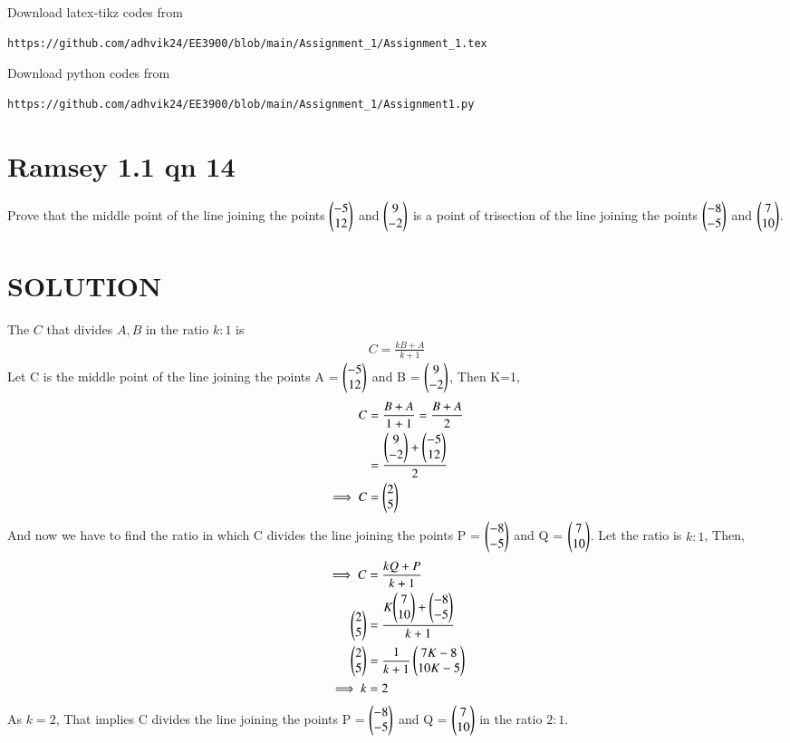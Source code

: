\documentclass[journal,12pt,twocolumn]{IEEEtran}
\begin{document}
%
Download latex-tikz codes from 
%
\begin{lstlisting}
https://github.com/adhvik24/EE3900/blob/main/Assignment_1/Assignment_1.tex
\end{lstlisting}
%
Download python codes from 
%
\begin{lstlisting}
https://github.com/adhvik24/EE3900/blob/main/Assignment_1/Assignment1.py
\end{lstlisting}
\section{Ramsey 1.1 qn 14}
Prove that the middle point of the line joining the points $\begin{pmatrix}-5\\12\end{pmatrix}$ and $\begin{pmatrix}9\\-2\end{pmatrix}$ is a point of trisection of the line
joining the points $\begin{pmatrix}-8\\-5\end{pmatrix}$ and $\begin{pmatrix}7\\10\end{pmatrix}$.
\section{SOLUTION}
The ${C}$ that divides ${A},{B}$ in the ratio $k:1$ is
\begin{align}
{C}=\frac{k{B}+{A}}{k+1}\label{0}
\end{align}
Let C is the middle point of the line joining the points A = $\begin{pmatrix}-5\\12\end{pmatrix}$ and B = $\begin{pmatrix}9\\-2\end{pmatrix}$, Then K=1,
\begin{align}
    {C}&=\frac{{B}+{A}}{1+1}=\frac{{B}+{A}}{2}\\
    &= \frac{\begin{pmatrix}9\\-2\end{pmatrix}+\begin{pmatrix}-5\\12\end{pmatrix}}{2}\\
    \implies {C}&= \begin{pmatrix}2\\5\end{pmatrix}
\end{align}
And now we have to find the ratio in which C divides the line
joining the points P = $\begin{pmatrix}-8\\-5\end{pmatrix}$ and Q = $\begin{pmatrix}7\\10\end{pmatrix}$. Let the ratio is $k:1$,
Then,
\begin{align}
    \implies {C}&=\frac{k{Q}+{P}}{k+1}\\
    \begin{pmatrix}2\\5\end{pmatrix} &= \frac{{K{\begin{pmatrix}7\\10\end{pmatrix}+\begin{pmatrix}-8\\-5\end{pmatrix}}}}{k+1}\\
    \begin{pmatrix}2\\5\end{pmatrix}&=\frac{1}{k+1} \begin{pmatrix}7K-8\\10K-5\end{pmatrix}\\
    \implies k &= 2
\end{align}
As $k=2$, That implies C divides the line
joining the points P = $\begin{pmatrix}-8\\-5\end{pmatrix}$ and Q = $\begin{pmatrix}7\\10\end{pmatrix}$ in the ratio $2:1$.
\end{document}
